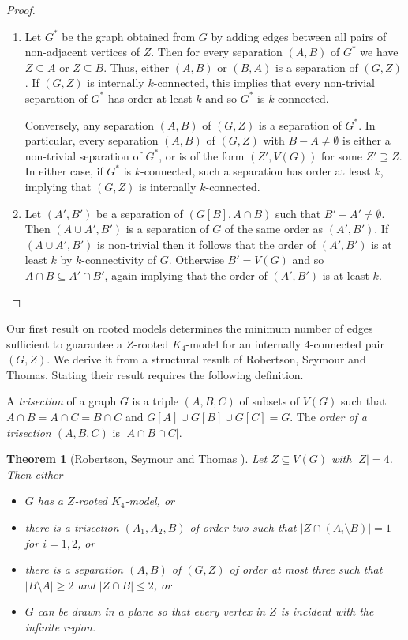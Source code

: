 \documentclass[reqno,final,12pt]{amsart}
\newtheorem{thm}{Theorem}
\begin{document}
{\begin{proof}
	\begin{enumerate} \item
	Let $G^*$ be the graph obtained from $G$ 	by adding edges between all pairs of non-adjacent vertices of $Z$. Then for every separation $(A,B)$ of $G^*$ we have $Z \subseteq A$ or $Z \subseteq B$. Thus, either $(A,B)$ or $(B,A)$ is a separation of $(G,Z)$. If $(G,Z)$ is internally $k$-connected, this implies that every non-trivial separation of $G^*$ has order at least $k$ and so $G^*$ is $k$-connected. 
	
	Conversely, any separation $(A,B)$ of $(G,Z)$ is a separation of $G^*$. 
    In particular, every separation $(A,B)$ of $(G,Z)$ with $B-A \neq \emptyset$ is either a non-trivial separation of $G^*$, or is of the form $(Z',V(G))$ for some $Z' \supseteq Z$. In either case, if  $G^*$ is $k$-connected, such a separation has order at least $k$, implying that $(G,Z)$ is internally $k$-connected.
	
	\item Let $(A',B')$ be a separation of  $(G[B],A \cap B)$  such that $B' - A' \neq \emptyset$. Then $(A  \cup A', B')$ is a separation of $G$ of the same order as $(A',B')$. If $(A  \cup A', B')$  is non-trivial then it follows that the order of  $(A',B')$  is at least $k$ by $k$-connectivity of $G$. Otherwise $B' = V(G)$ and so $A \cap B \subseteq A' \cap B'$, again implying that the order of  $(A',B')$  is at least $k$.
		\end{enumerate}	
\end{proof}


Our first result on rooted models determines the minimum number of edges sufficient to guarantee a $Z$-rooted $K_4$-model for an internally $4$-connected pair $(G,Z)$. We derive it from a structural result of Robertson, Seymour and Thomas. Stating their result requires the following definition.

 A \emph{trisection} of a graph $G$ is a triple $(A,B,C)$ of subsets of $V(G)$ such that
$A \cap B = A \cap C = B \cap C$ and $G[A] \cup G[B] \cup G[C]=G$. The \emph{order of a trisection $(A,B,C)$} is $|A \cap B \cap C|$.

\begin{thm}[Robertson, Seymour and Thomas {\cite[(2.6)]{RST1993}}]
	\label{t:RST26}
	Let $Z \subseteq V(G)$ with $|Z|=4$. Then either
	\begin{itemize}
		\item[(i)] $G$ has a $Z$-rooted $K_4$-model, or
		\item[(ii)] there is a trisection $(A_1,A_2,B)$ of order two such that $|Z \cap (A_i \setminus B)| = 1$ for $i = 1, 2$, or
		\item[(iii)] there is a separation $(A,B)$ of $(G,Z)$ of order at most three such that $|B \setminus A| \geq 2$ and $|Z \cap B| \leq 2$, or
		\item[(iv)] $G$ can be drawn in a plane so that every vertex in $Z$ is incident with the infinite region.
	\end{itemize}
\end{thm}

}
\end{document}

